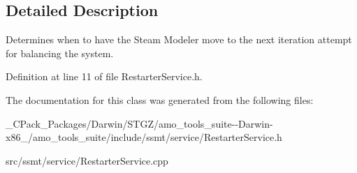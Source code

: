 \subsection{Detailed Description}
Determines when to have the Steam Modeler move to the next iteration attempt for balancing the system. 

Definition at line 11 of file Restarter\+Service.\+h.



The documentation for this class was generated from the following files\+:\begin{DoxyCompactItemize}
\item 
\+\_\+\+C\+Pack\+\_\+\+Packages/\+Darwin/\+S\+T\+G\+Z/amo\+\_\+tools\+\_\+suite-\/-\/\+Darwin-\/x86\+\_/amo\+\_\+tools\+\_\+suite/include/ssmt/service/Restarter\+Service.\+h\item 
src/ssmt/service/Restarter\+Service.\+cpp\end{DoxyCompactItemize}
